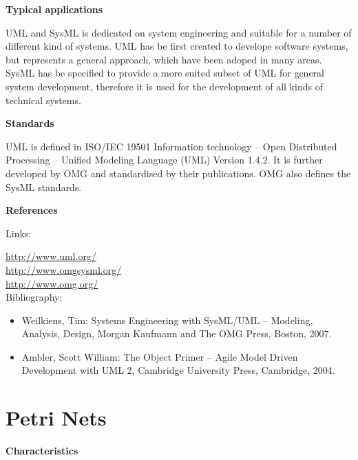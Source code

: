 \documentclass{./template/openetcs_report}
\begin{document}
	\textbf{Typical applications}

UML and SysML is dedicated on system engineering and suitable for a number of different kind of systems.
UML has be first created to develope software systems, but represents a general approach, which have been adoped in many areas. SysML has be specified to provide a more suited subset of UML for general system development, therefore it is used for the development of all kinds of technical systems.

	\textbf{Standards}

UML is defined in ISO/IEC 19501 Information technology -- Open Distributed Processing -- Unified Modeling Language (UML) Version 1.4.2. It is further developed by OMG and standardised by their publications. OMG also defines the SysML standards.

	\textbf{References}

Links:

\url{http://www.uml.org/} \\[4pt]
\url{http://www.omgsysml.org/}\\[4pt]
\url{http://www.omg.org/} \\[4pt]

Bibliography:
\begin{itemize}
\item Weilkiens, Tim: Systems Engineering with SysML/UML -- Modeling, Analysis, Design, Morgan Kaufmann and The OMG Press, Boston, 2007.
\item Ambler, Scott William: The Object Primer -- Agile Model Driven Development with UML 2, Cambridge University Press, Cambridge, 2004.
\end{itemize}

\section{Petri Nets}


	\textbf{Characteristics}
\end{document}
